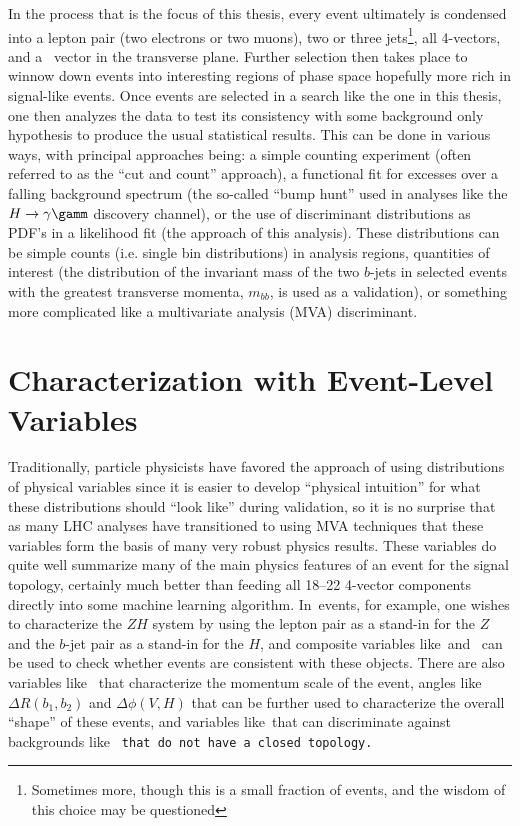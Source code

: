 In the process that is the focus of this thesis, every event ultimately is condensed into a lepton pair (two electrons or two muons), two or three jets\footnote{Sometimes more, though this is a small fraction of events, and the wisdom of this choice may be questioned}, all 4-vectors, and a \met\, vector in the transverse plane.  Further selection then takes place to winnow down events into interesting regions of phase space hopefully more rich in signal-like events.  Once events are selected in a search like the one in this thesis, one then analyzes the data to test its consistency with some background only hypothesis to produce the usual statistical results.  This can be done in various ways, with principal approaches being: a simple counting experiment (often referred to as the ``cut and count'' approach), a functional fit for excesses over a falling background spectrum (the so-called ``bump hunt'' used in analyses like the $H\to\gamma\gamm$ discovery channel), or the use of discriminant distributions as PDF's in a likelihood fit (the approach of this analysis).  These distributions can be simple counts (i.e. single bin distributions) in analysis regions, quantities of interest (the distribution of the invariant mass of the two $b$-jets in selected events with the greatest transverse momenta, $m_{bb}$, is used as a validation), or something more complicated like a multivariate analysis (MVA) discriminant.

\section{Characterization with Event-Level Variables}
Traditionally, particle physicists have favored the approach of using distributions of physical variables since it is easier to develop ``physical intuition'' for what these distributions should ``look like'' during validation, so it is no surprise that as many LHC analyses have transitioned to using MVA techniques that these variables form the basis of many very robust physics results.  These variables do quite well summarize many of the main physics features of an event for the signal topology, certainly much better than feeding all 18--22 4-vector components directly into some machine learning algorithm.  In \ZH\,events, for example, one wishes to characterize the $ZH$ system by using the lepton pair as a stand-in for the $Z$ and the $b$-jet pair as a stand-in for the $H$, and composite variables like \mbb\,and \mll\, can be used to check whether events are consistent with these objects.  There are also variables like \ptv\, that characterize the momentum scale of the event, angles like $\Delta R\left(b_1,b_2\right)$ and $\Delta\phi\left(V,H\right)$ that can be further used to characterize the overall ``shape'' of these events, and variables like \met\,that can discriminate against backgrounds like \tt\,that do not have a closed topology.


